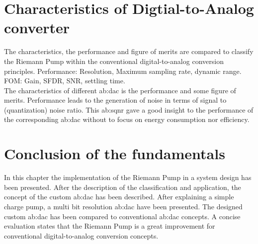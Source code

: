 \section{Characteristics of Digtial-to-Analog converter}
\label{ch:characteristics}
The characteristics, the performance and figure of merits are compared to classify the Riemann Pump within the conventional digital-to-analog conversion principles.
Performance: Resolution, Maximum sampling rate, dynamic range.
FOM: Gain, SFDR, SNR, settling time.\\
The characteristics of different \gls{ab:dac} is the performance and some figure of merits.
Performance leads to the generation of noise in terms of signal to (quantization) noise ratio.
This \gls{ab:sqnr} gave a good insight to the performance of the corresponding \gls{ab:dac} without to focus on energy consumption nor efficiency.


\section{Conclusion of the fundamentals}
In this chapter the implementation of the Riemann Pump in a system design has been presented.
After the description of the classification and application, the concept of the custom \gls{ab:dac} has been described.
After explaining a simple charge pump, a multi bit resolution \gls{ab:dac} have been presented.
The designed custom \gls{ab:dac} has been compared to conventional \gls{ab:dac} concepts.
A concise evaluation states that the Riemann Pump is a great improvement for conventional digital-to-analog conversion concepts.
